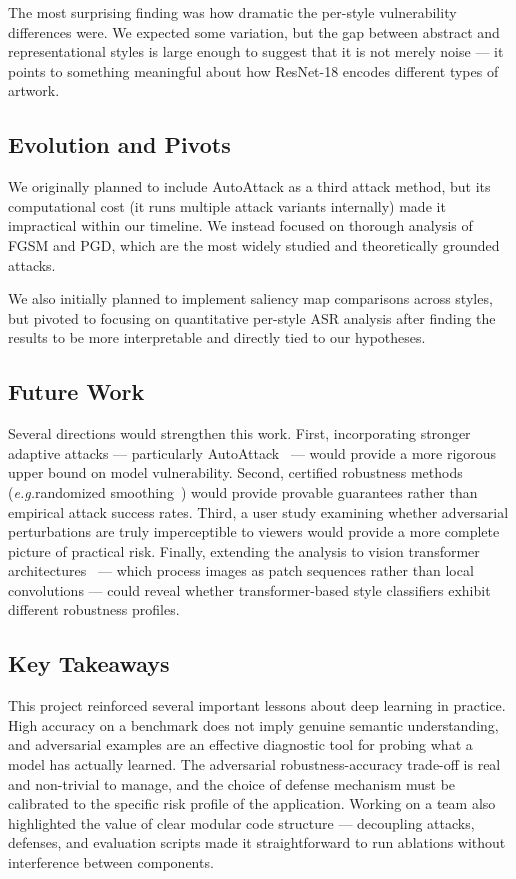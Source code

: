 \documentclass[conference]{IEEEtran}
\newcommand{\eg}{\textit{e.g.}}
\begin{document}
The most surprising finding was how dramatic the per-style vulnerability differences were. We expected some variation, but the gap between abstract and representational styles is large enough to suggest that it is not merely noise — it points to something meaningful about how ResNet-18 encodes different types of artwork.

\subsection{Evolution and Pivots}

We originally planned to include AutoAttack as a third attack method, but its computational cost (it runs multiple attack variants internally) made it impractical within our timeline. We instead focused on thorough analysis of FGSM and PGD, which are the most widely studied and theoretically grounded attacks.

We also initially planned to implement saliency map comparisons across styles, but pivoted to focusing on quantitative per-style ASR analysis after finding the results to be more interpretable and directly tied to our hypotheses.

\subsection{Future Work}

Several directions would strengthen this work. First, incorporating stronger adaptive attacks — particularly AutoAttack~\cite{croce2020autoattack} — would provide a more rigorous upper bound on model vulnerability. Second, certified robustness methods (\eg randomized smoothing~\cite{cohen2019certified}) would provide provable guarantees rather than empirical attack success rates. Third, a user study examining whether adversarial perturbations are truly imperceptible to viewers would provide a more complete picture of practical risk. Finally, extending the analysis to vision transformer architectures~\cite{dosovitskiy2020vit} — which process images as patch sequences rather than local convolutions — could reveal whether transformer-based style classifiers exhibit different robustness profiles.

\subsection{Key Takeaways}

This project reinforced several important lessons about deep learning in practice. High accuracy on a benchmark does not imply genuine semantic understanding, and adversarial examples are an effective diagnostic tool for probing what a model has actually learned. The adversarial robustness-accuracy trade-off is real and non-trivial to manage, and the choice of defense mechanism must be calibrated to the specific risk profile of the application. Working on a team also highlighted the value of clear modular code structure — decoupling attacks, defenses, and evaluation scripts made it straightforward to run ablations without interference between components.
\end{document}
